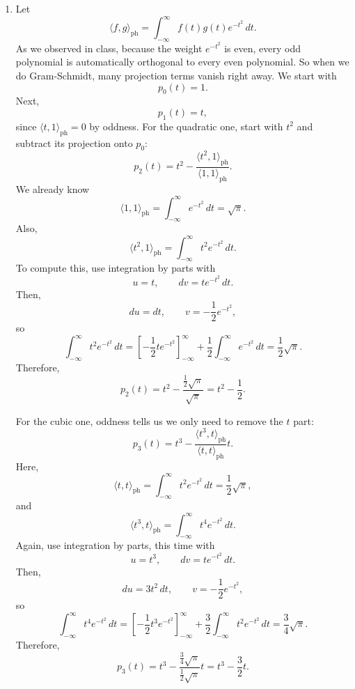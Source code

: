 \documentclass[10pt]{extarticle}
\begin{document}
\begin{enumerate}[label=(\alph*)]
\item Let
\[
\langle f,g\rangle_{\mathrm{ph}}
=\int_{-\infty}^{\infty} f(t)g(t)e^{-t^2}\,dt.
\]
As we observed in class, because the weight $e^{-t^2}$ is even, every odd polynomial is automatically orthogonal to every even polynomial. So when we do Gram-Schmidt, many projection terms vanish right away. We start with
\[
p_0(t)=1.
\]
Next,
\[
p_1(t)=t,
\]
since $\langle t,1\rangle_{\mathrm{ph}}=0$ by oddness. For the quadratic one, start with $t^2$ and subtract its projection onto $p_0$:
\[
p_2(t)=t^2-\frac{\langle t^2,1\rangle_{\mathrm{ph}}}{\langle 1,1\rangle_{\mathrm{ph}}}.
\]
We already know
\[
\langle 1,1\rangle_{\mathrm{ph}}
=\int_{-\infty}^{\infty} e^{-t^2}\,dt
=\sqrt{\pi}.
\]
Also,
\[
\langle t^2,1\rangle_{\mathrm{ph}}
=\int_{-\infty}^{\infty} t^2e^{-t^2}\,dt.
\]
To compute this, use integration by parts with
\[
u=t,\qquad dv=te^{-t^2}\,dt.
\]
Then,
\[
du=dt,\qquad v=-\frac{1}{2}e^{-t^2},
\]
so
\[
\int_{-\infty}^{\infty} t^2e^{-t^2}\,dt
=\left[-\frac{1}{2}te^{-t^2}\right]_{-\infty}^{\infty}
+\frac{1}{2}\int_{-\infty}^{\infty} e^{-t^2}\,dt
=\frac{1}{2}\sqrt{\pi}.
\]
Therefore,
\[
p_2(t)=t^2-\frac{\frac{1}{2}\sqrt{\pi}}{\sqrt{\pi}}
=t^2-\frac{1}{2}.
\]

For the cubic one, oddness tells us we only need to remove the $t$ part:
\[
p_3(t)=t^3-\frac{\langle t^3,t\rangle_{\mathrm{ph}}}{\langle t,t\rangle_{\mathrm{ph}}}t.
\]
Here,
\[
\langle t,t\rangle_{\mathrm{ph}}
=\int_{-\infty}^{\infty} t^2e^{-t^2}\,dt
=\frac{1}{2}\sqrt{\pi},
\]
and
\[
\langle t^3,t\rangle_{\mathrm{ph}}
=\int_{-\infty}^{\infty} t^4e^{-t^2}\,dt.
\]
Again, use integration by parts, this time with
\[
u=t^3,\qquad dv=te^{-t^2}\,dt.
\]
Then,
\[
du=3t^2\,dt,\qquad v=-\frac{1}{2}e^{-t^2},
\]
so
\[
\int_{-\infty}^{\infty} t^4e^{-t^2}\,dt
=\left[-\frac{1}{2}t^3e^{-t^2}\right]_{-\infty}^{\infty}
+\frac{3}{2}\int_{-\infty}^{\infty} t^2e^{-t^2}\,dt
=\frac{3}{4}\sqrt{\pi}.
\]
Therefore,
\[
p_3(t)=t^3-\frac{\frac{3}{4}\sqrt{\pi}}{\frac{1}{2}\sqrt{\pi}}t
=t^3-\frac{3}{2}t.
\]


\end{enumerate}
\end{document}
